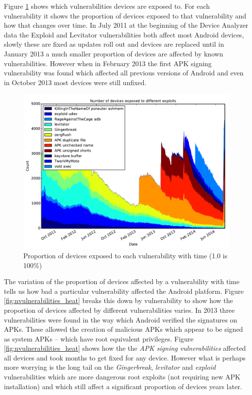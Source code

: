 \documentclass[conference,a4paper,twoside]{IEEEtran}
\begin{document}
Figure \ref{fig:vulnerabilities} shows which vulnerabilities devices are exposed to.
For each vulnerability it shows the proportion of devices exposed to that vulnerability and how that changes over time.
In July 2011 at the beginning of the Device Analyzer data the Exploid and Levitator vulnerabilities both affect most Android devices, slowly these are fixed as updates roll out and devices are replaced until in January 2013 a much smaller proportion of devices are affected by known vulnerabilities.
However when in February 2013 the first APK signing vulnerability was found which affected all previous versions of Android and even in October 2013 most devices were still unfixed. %
\begin{figure}%
\centering
\includegraphics[width=\columnwidth]{figures/vulnerabilities}
\caption{Proportion of devices exposed to each vulnerability with time (1.0 is 100\%)}
\label{fig:vulnerabilities}
\end{figure}

The variation of the proportion of devices affected by a vulnerability with time tells us how bad a particular vulnerability affected the Android platform.
Figure \ref{fig:nvulnerabilities_heat} breaks this down by vulnerability to show how the proportion of devices affected by different vulnerabilities varies.
In 2013 three vulnerabilities were found in the way which Android verified the signatures on APKs.
These allowed the creation of malicious APKs which appear to be signed as system APKs -- which have root equivalent privileges.
Figure \ref{fig:nvulnerabilities_heat} shows how the the \emph{APK signing vulnerabilities} affected all devices and took months to get fixed for any device.
However what is perhaps more worrying is the long tail on the \emph{Gingerbreak}, \emph{levitator} and \emph{exploid} vulnerabilities which are more dangerous root exploits (not requiring new APK installation) and which still affect a significant proportion of devices years later.
\end{document}
